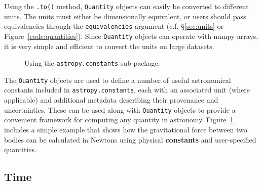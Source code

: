 \documentclass[traditabstract]{aa}
\begin{document}
Using the \texttt{.to()} method, \texttt{Quantity} objects can easily be
converted to different units. The units must either be dimensionally
equivalent, or users should pass equivalencies through the
\texttt{equivalencies} argument (c.f. \S\ref{sec:units} or Figure~\ref{code:quantities}).
Since \texttt{Quantity} objects can operate with \gls{numpy} arrays, it is very simple
and efficient to convert the units on large datasets.

\begin{figure}
\center
\caption{Using the \texttt{astropy.constants} sub-package.\label{code:constants}}
\vspace{0.1in}
\end{figure}

The \texttt{Quantity} objects are used to define a number of useful
astronomical constants included in \texttt{astropy.constants}, each with an associated unit
(where applicable) and additional metadata describing their provenance and
uncertainties. These can be used along with \texttt{Quantity} objects to
provide a convenient framework for computing any quantity in astronomy.
Figure~\ref{code:constants} includes a simple example that shows how the
gravitational force between two bodies can be calculated in Newtons using
physical \textbf{constants} and user-specified quantities.

\subsection{Time}
\end{document}
